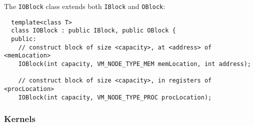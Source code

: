 \noindent The {\tt IOBlock} class extends both {\tt IBlock} and {\tt OBlock}:

{\small
\begin{verbatim}
  template<class T>
  class IOBlock : public IBlock, public OBlock {
  public:
    // construct block of size <capacity>, at <address> of <memLocation>
    IOBlock(int capacity, VM_NODE_TYPE_MEM memLocation, int address);

    // construct block of size <capacity>, in registers of <procLocation>
    IOBlock(int capacity, VM_NODE_TYPE_PROC procLocation);
\end{verbatim}}

\subsubsection{Kernels}
\label{sec:kernels}

